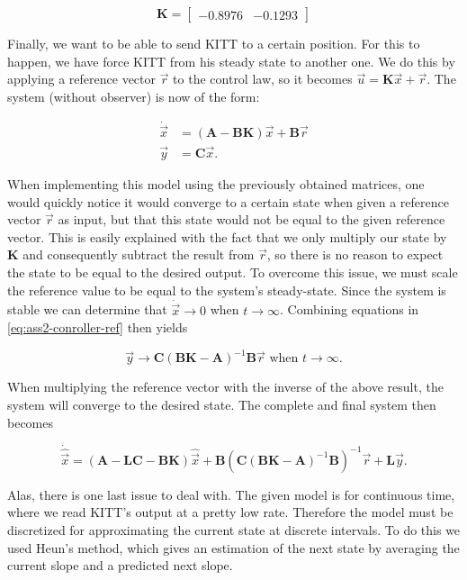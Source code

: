 \documentclass[11pt,titlepage]{report}
\begin{document}
\begin{equation}
	\mathbf{K} = 
		\begin{bmatrix}
			-0.8976 & -0.1293
		\end{bmatrix}
\end{equation}

Finally, we want to be able to send KITT to a certain position. For this to happen, we have force KITT from his steady state to another one. We do this by applying a reference vector $\vec{r}$ to the control law, so it becomes $\vec{u} = \mathbf{K}\vec{x} + \vec{r}$. The system (without observer) is now of the form:

\begin{align}
	\dot{\vec{x}} &= (\mathbf{A}-\mathbf{B}\mathbf{K})\vec{x} + \mathbf{B}\vec{r} \\
	\vec{y} &= \mathbf{C}\vec{x}.
	\label{eq:ass2-conroller-ref}
\end{align}

When implementing this model using the previously obtained matrices, one would quickly notice it would converge to a certain state when given a reference vector $\vec{r}$ as input, but that this state would not be equal to the given reference vector. This is easily explained with the fact that we only multiply our state by $\mathbf{K}$ and consequently subtract the result from $\vec{r}$, so there is no reason to expect the state to be equal to the desired output. To overcome this issue, we must scale the reference value to be equal to the system's steady-state. Since the system is stable we can determine that $\dot{\vec{x}} \to 0$ when $t \to \infty$. Combining equations in \ref{eq:ass2-conroller-ref} then yields

\begin{equation}
	\vec{y} \to \mathbf{C} (\mathbf{B} \mathbf{K} - \mathbf{A})^{-1} \mathbf{B} \vec{r} \text{ when } t \to \infty.
\end{equation}

When multiplying the reference vector with the inverse of the above result, the system will converge to the desired state. The complete and final system then becomes

\begin{equation}
	\dot{\hat{\vec{x}}} = (\mathbf{A}-\mathbf{L}\mathbf{C}-\mathbf{B}\mathbf{K}) \hat{\vec{x}} + \mathbf{B}(\mathbf{C}(\mathbf{B} \mathbf{K} - \mathbf{A})^{-1} \mathbf{B})^{-1} \vec{r} + \mathbf{L} \vec{y}.
\end{equation}

Alas, there is one last issue to deal with. The given model is for continuous time, where we read KITT's output at a pretty low rate. Therefore the model must be discretized for approximating the current state at discrete intervals. To do this we used Heun's method, which gives an estimation of the next state by averaging the current slope and a predicted next slope. \cite{wikipedia-heuns}
\end{document}
